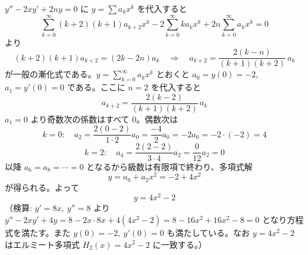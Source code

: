 
$y'' - 2xy' + 2ny = 0$ に $y = \sum a_k x^k$ を代入すると
\[
\sum_{k=0}^{\infty}(k+2)(k+1)a_{k+2}x^k - 2\sum_{k=0}^{\infty} k a_k x^k + 2n\sum_{k=0}^{\infty} a_k x^k = 0
\]
より
\[
(k+2)(k+1)a_{k+2} = (2k - 2n)a_k
\quad\Longrightarrow\quad
a_{k+2} = \frac{2(k-n)}{(k+1)(k+2)}\,a_k
\]
が一般の漸化式である。$y=\sum_{k=0}^{\infty}a_k x^k$ とおくと $a_0 = y(0) = -2$, $a_1 = y'(0) = 0$ である。ここに $n=2$ を代入すると
\[
a_{k+2} = \frac{2(k-2)}{(k+1)(k+2)}\,a_k
\]
$a_1=0$ より奇数次の係数はすべて $0$。偶数次は
\[
k=0:\quad a_2 = \frac{2(0-2)}{1\cdot 2}a_0 = \frac{-4}{2}a_0 = -2a_0 = -2\cdot(-2) = 4
\]
\[
k=2:\quad a_4 = \frac{2(2-2)}{3\cdot 4}a_2 = \frac{0}{12}a_2 = 0
\]
以降 $a_6=a_8=\cdots=0$ となるから級数は有限項で終わり、多項式解
\[
y = a_0 + a_2 x^{2} = -2 + 4x^{2}
\]
が得られる。よって
\[
\boxed{\; y = 4x^{2} - 2 \;}
\]
（検算: $y'=8x,\ y''=8$ より $y''-2xy'+4y = 8 - 2x\cdot 8x + 4(4x^2-2) = 8-16x^2+16x^2-8 = 0$ となり方程式を満たす。また $y(0)=-2,\ y'(0)=0$ も満たしている。なお $y=4x^2-2$ はエルミート多項式 $H_2(x)=4x^2-2$ に一致する。）

